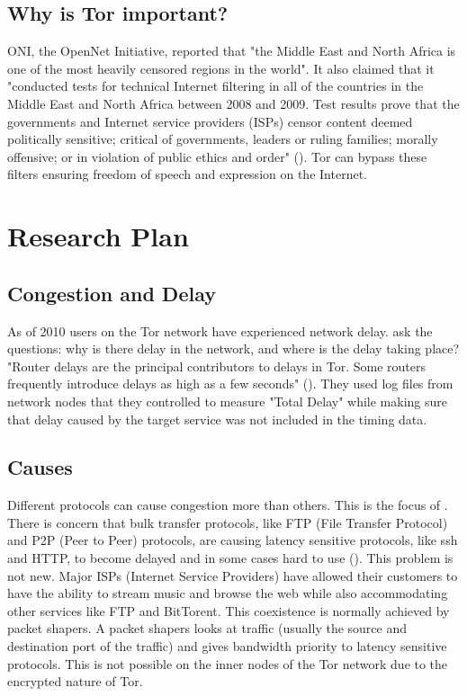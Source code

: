 \documentclass[letterpaper,13pt]{texMemo}
\begin{document}
    \subsection*{Why is Tor important?}
    ONI, the OpenNet Initiative, reported that "the Middle East and North Africa is one of the most
    heavily censored regions in the world". It also claimed that it "conducted tests for technical
    Internet filtering in all of the countries in the Middle East and North Africa between 2008 and
    2009. Test results prove that the governments and Internet service providers (ISPs) censor
    content deemed politically sensitive; critical of governments, leaders or ruling families;
    morally offensive; or in violation of public ethics and order" (\citeauthor[6]{ONI}). Tor can
    bypass these filters ensuring freedom of speech and expression on the Internet.

\section*{Research Plan}


    \subsection*{Congestion and Delay}
    As of 2010 users on the Tor network have experienced network delay. \citeauthor[]{delay} ask the
    questions: why is there delay in the network, and where is the delay taking place? "Router delays
    are the principal contributors to delays in Tor. Some routers frequently introduce delays as
    high as a few seconds" (\citeauthor[3]{delay}). They used log files from network nodes that they
    controlled to measure "Total Delay" while making sure that delay caused by the target service was not
    included in the timing data.

    \subsection*{Causes}
    Different protocols can cause congestion more than others. This is the focus of
    \citeauthor{analysis}. There is concern that bulk transfer protocols, like FTP (File Transfer
    Protocol) and P2P (Peer to Peer) protocols, are causing latency sensitive protocols, like ssh
    and HTTP, to become delayed and in some cases hard to use (\citeauthor[2]{analysis}). This
    problem is not new. Major ISPs (Internet Service Providers) have allowed their customers to have
    the ability to stream music and browse the web while also accommodating other services like FTP
    and BitTorent. This coexistence is normally achieved by packet shapers. A packet shapers looks
    at traffic (usually the source and destination port of the traffic) and gives bandwidth priority
    to latency sensitive protocols. This is not possible on the inner nodes of the Tor network due
    to the encrypted nature of Tor.
\end{document}
